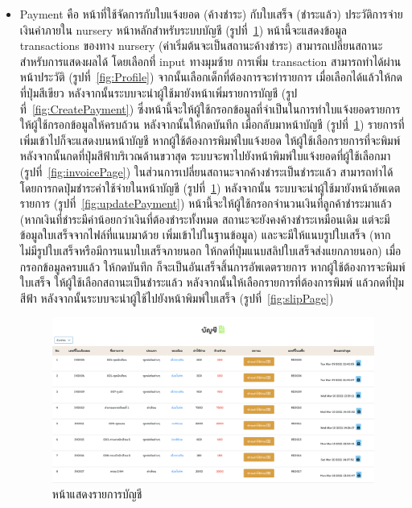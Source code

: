 \begin{itemize}
  \item  Payment คือ หน้าที่ใช้จัดการกับใบแจ้งยอด (ค้างชำระ) กับใบเสร็จ (ชำระแล้ว) ประวัติการจ่ายเงินค่าภายใน nursery หน้าหลักสำหรับระบบบัญชี (รูปที่~\ref{fig:Payment}) หน้านี้จะแสดงข้อมูล transactions ของทาง nursery (ค่าเริ่มต้นจะเป็นสถานะค้างชำระ) สามารถเปลี่ยนสถานะสำหรับการแสดงผลได้ โดยเลือกที่ input ทางมุมซ้าย 
  การเพิ่ม transaction สามารถทำได้ผ่านหน้าประวัติ (รูปที่~\ref{fig:Profile}) จากนั้นเลือกเด็กที่ต้องการจะทำรายการ เมื่อเลือกได้แล้วให้กดที่ปุ่มสีเขียว
  หลังจากนั้นระบบจะนำผู้ใช้มายังหน้าเพิ่มรายการบัญชี (รูปที่~\ref{fig:CreatePayment}) ซึ่งหน้านี้จะให้ผู้ใช้กรอกข้อมูลที่จำเป็นในการทำใบแจ้งยอดรายการ ให้ผู้ใช้กรอกข้อมูลให้ครบถ้วน หลังจากนั้นให้กดบันทึก
  เมื่อกลับมาหน้าบัญชี (รูปที่~\ref{fig:Payment}) รายการที่เพิ่มเข้าไปก็จะแสดงบนหน้าบัญชี หากผู้ใช้ต้องการพิมพ์ใบแจ้งยอด ให้ผู้ใช้เลือกรายการที่จะพิมพ์ หลังจากนั้นกดที่ปุ่มสีฟ้าบริเวณด้านขวาสุด
  ระบบจะพาไปยังหน้าพิมพ์ใบแจ้งยอดที่ผู้ใช้เลือกมา (รูปที่~\ref{fig:invoicePage}) 
  ในส่วนการเปลี่ยนสถานะจากค้างชำระเป็นชำระแล้ว สามารถทำได้โดยการกดปุ่มชำระค่าใช้จ่ายในหน้าบัญชี (รูปที่~\ref{fig:Payment}) หลังจากนั้น ระบบจะนำผู้ใช้มายังหน้าอัพเดตรายการ (รูปที่~\ref{fig:updatePayment})
  หน้านี้จะให้ผู้ใช้กรอกจำนวนเงินที่ลูกค้าชำระมาแล้ว (หากเงินที่ชำระมีค่าน้อยกว่าเงินที่ต้องชำระทั้งหมด สถานะจะยังคงค้างชำระเหมือนเดิม แต่จะมีข้อมูลใบเสร็จจากไฟล์ที่แนบมาด้วย เพิ่มเข้าไปในฐานข้อมูล) และจะมีให้แนบรูปใบเสร็จ (หากไม่มีรูปใบเสร็จหรือมีการแนบใบเสร็จภายนอก ให้กดที่ปุ่มแนบสลิปใบเสร็จส่งแยกภายนอก)
  เมื่อกรอกข้อมูลครบแล้ว ให้กดบันทึก ก็จะเป็นอันเสร็จสิ้นการอัพเดตรายการ หากผู้ใช้ต้องการจะพิมพ์ใบเสร็จ
  ให้ผู้ใช้เลือกสถานะเป็นชำระแล้ว หลังจากนั้นให้เลือกรายการที่ต้องการพิมพ์ แล้วกดที่ปุ่มสีฟ้า
  หลังจากนั้นระบบจะนำผู้ใช้ไปยังหน้าพิมพ์ใบเสร็จ (รูปที่~\ref{fig:slipPage}) 

  \begin{figure}
    \begin{center}
    \includegraphics[width=\linewidth]{images/Payment.png}
    \end{center}
    \caption[หน้าแสดงรายการบัญชี]{หน้าแสดงรายการบัญชี}
    \label{fig:Payment}
  

\end{figure}
\end{itemize}
